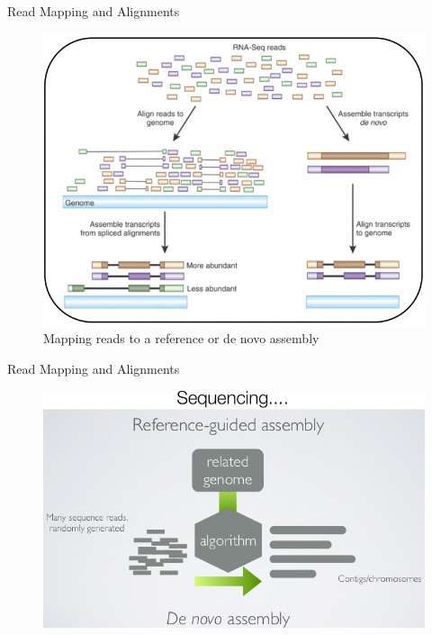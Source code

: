 \documentclass{if-beamer}
\begin{document}
\begin{frame}{Read Mapping and Alignments}
\begin{figure}
\centering
\includegraphics[scale=0.4]{rna_seq_align.PNG}
\caption{Mapping reads to a reference or de novo assembly}
\end{figure}
\end{frame}
\begin{frame}{Read Mapping and Alignments}
\begin{figure}
\centering
\includegraphics[scale=0.5]{sequencing.PNG}
\end{figure}
\end{frame}
\end{document}
